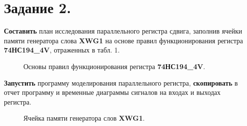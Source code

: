 \documentclass[spec, och, otchet, hidelinks]{SCWorks}
\begin{document}
\newpage

\section*{Задание 2.}

\textbf{Составить} план исследования параллельного регистра сдвига, заполнив ячейки памяти генератора слова \textbf{XWG1} на основе правил 
функционирования регистра \textbf{74НС194\_4V}, отраженных в табл. 1.

\begin{figure}[h]
	\caption{Основы правил функционирования регистра \textbf{74НС194\_4V}.}
\end{figure}

\textbf{Запустить} программу моделирования параллельного регистра, \textbf{скопировать} в  отчет программу и временные диаграммы сигналов на входах 
и выходах регистра.

\begin{figure}[h]
	\caption{Ячейка памяти генератора слов \textbf{XWG1}.}
\end{figure}
\end{document}
